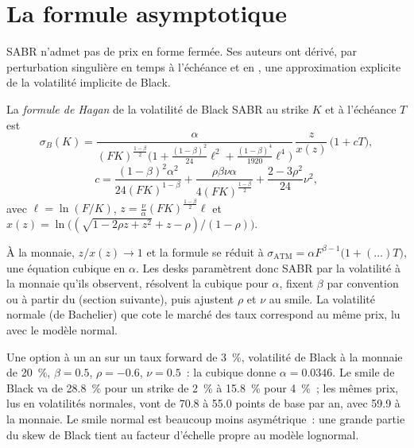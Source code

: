 \section{La formule asymptotique}

SABR n'admet pas de prix en forme fermée. Ses auteurs ont dérivé, par perturbation singulière en
temps à l'échéance et en , une approximation explicite de la volatilité implicite de Black.

\begin{definition}\label{def:dv:sabr-and-smile-dynamics:hagan}
La \emph{formule de Hagan} de la volatilité de Black SABR au strike $K$ et à
l'échéance $T$ est
\[
\sigma_B(K)=\frac{\alpha}{(FK)^{\frac{1-\beta}2}\bigl(1+\frac{(1-\beta)^2}{24}\ell^2+
\frac{(1-\beta)^4}{1920}\ell^4\bigr)}\,\frac{z}{x(z)}\,\bigl(1+cT\bigr),
\]
\[
c=\frac{(1-\beta)^2\alpha^2}{24(FK)^{1-\beta}}+\frac{\rho\beta\nu\alpha}{4(FK)^{\frac{1-\beta}2}}
+\frac{2-3\rho^2}{24}\nu^2,
\]
avec $\ell=\ln(F/K)$, $z=\frac\nu\alpha(FK)^{\frac{1-\beta}2}\ell$ et
$x(z)=\ln\bigl((\sqrt{1-2\rho z+z^2}+z-\rho)/(1-\rho)\bigr)$.
\end{definition}

À la monnaie, $z/x(z)\to1$ et la formule se réduit à
$\sigma_{\mathrm{ATM}}=\alpha F^{\beta-1}\bigl(1+(\dots)T\bigr)$, une équation cubique en $\alpha$. Les desks
paramètrent donc SABR par la volatilité à la monnaie qu'ils observent, résolvent la cubique pour
$\alpha$, fixent $\beta$ par convention ou à partir du  (section suivante), puis ajustent $\rho$
et $\nu$ au smile. La volatilité normale (de Bachelier) que cote le marché des taux correspond au même prix, lu avec le modèle normal.

\begin{example}\label{ex:dv:sabr-and-smile-dynamics:rates}
Une option à un an sur un taux forward de 3~\%, volatilité de Black à la monnaie de 20~\%, $\beta=0.5$, $\rho=-0.6$,
$\nu=0.5$~: la cubique donne $\alpha=0.0346$. Le smile de Black va de 28.8~\% pour un strike de 2~\% à 15.8~\% pour
4~\%~; les mêmes prix, lus en volatilités normales, vont de 70.8 à 55.0 points de base par an, avec 59.9 à la monnaie. Le
smile normal est beaucoup moins asymétrique~: une grande partie du skew de Black tient au facteur d'échelle propre au modèle lognormal.
\end{example}

